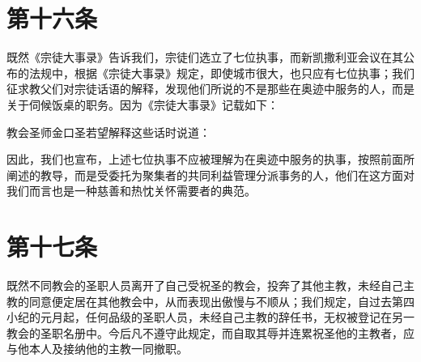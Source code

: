 
\section{第十六条}

既然《宗徒大事录》告诉我们，宗徒们选立了七位执事，而新凯撒利亚会议在其公布的法规中，根据《宗徒大事录》规定，即使城市很大，也只应有七位执事；我们征求教父们对宗徒话语的解释，发现他们所说的不是那些在奥迹中服务的人，而是关于伺候饭桌的职务。因为《宗徒大事录》记载如下：\par

教会圣师金口圣若望解释这些话时说道：\par

因此，我们也宣布，上述七位执事不应被理解为在奥迹中服务的执事，按照前面所阐述的教导，而是受委托为聚集者的共同利益管理分派事务的人，他们在这方面对我们而言也是一种慈善和热忱关怀需要者的典范。\par


\section{第十七条}

既然不同教会的圣职人员离开了自己受祝圣的教会，投奔了其他主教，未经自己主教的同意便定居在其他教会中，从而表现出傲慢与不顺从；我们规定，自过去第四小纪的元月起，任何品级的圣职人员，未经自己主教的辞任书，无权被登记在另一教会的圣职名册中。今后凡不遵守此规定，而自取其辱并连累祝圣他的主教者，应与他本人及接纳他的主教一同撤职。\par


